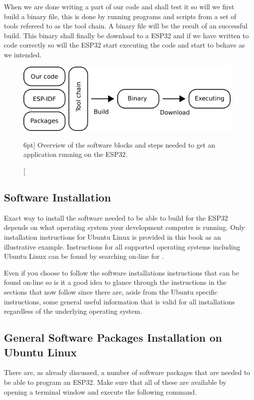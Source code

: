 \documentclass{tufte-book}
\begin{document}
When we are done writing a part of our code and shall test it so will we first build a binary file, this is done by running programs and scripts from a set of tools refereed to as the tool chain. A binary file will be the result of an successful build. This binary shall finally be download to a ESP32 and if we have written to code correctly so will the ESP32 start executing the code and start to behave as we intended. 

\begin{figure}
	\includegraphics[scale=1.0]{software_anatomy.png}
	\caption[Software development $n$.][6pt]{
	Overview of the software blocks and steps needed to get an application
	running on the ESP32.
	}
	\label{fig:software_anatomy}
\end{figure}

\subsection{Software Installation}
Exact way to install the software needed to be able to build for the ESP32 depends on what operating system your development computer is running.
Only installation instructions for Ubuntu Linux is provided in this book as an illustrative example. Instructions for all supported operating systems including Ubuntu Linux can be found by searching on-line for .

Even if you choose to follow the software installations instructions that can be found on-line so is it a good idea to glance through the instructions in the sections that now follow since there are, aside from the Ubuntu specific instructions, some general useful information that is valid for all installations regardless of the underlying operating system.

\subsection{General Software Packages Installation on Ubuntu Linux}
There are, as already discussed, a number of software packages that are needed to be able to program an ESP32. Make sure that all of these are available by opening a terminal window and execute the following command.
	
\end{document}
